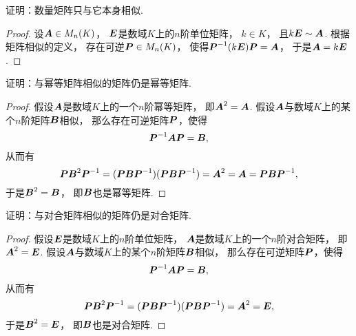 \begin{example}
证明：数量矩阵只与它本身相似.
\begin{proof}
设\(\boldsymbol{A} \in M_n(K)\)，
\(\boldsymbol{E}\)是数域\(K\)上的\(n\)阶单位矩阵，
\(k \in K\)，
且\(k\boldsymbol{E} \sim \boldsymbol{A}\).
根据矩阵相似的定义，
存在可逆\(\boldsymbol{P} \in M_n(K)\)，
使得\(\boldsymbol{P}^{-1} (k\boldsymbol{E}) \boldsymbol{P} = \boldsymbol{A}\)，
于是\(\boldsymbol{A} = k\boldsymbol{E}\).
\end{proof}
\end{example}
\begin{example}\label{example:幂等矩阵.幂等矩阵的相似类}
证明：与幂等矩阵相似的矩阵仍是幂等矩阵.
\begin{proof}
假设\(\boldsymbol{A}\)是数域\(K\)上的一个\(n\)阶幂等矩阵，
即\(\boldsymbol{A}^2=\boldsymbol{A}\).
假设\(\boldsymbol{A}\)与数域\(K\)上的某个\(n\)阶矩阵\(\boldsymbol{B}\)相似，
那么存在可逆矩阵\(\boldsymbol{P}\)，使得\begin{equation*}
	\boldsymbol{P}^{-1}\boldsymbol{A}\boldsymbol{P} = \boldsymbol{B},
\end{equation*}
从而有\begin{equation*}
	\boldsymbol{P}\boldsymbol{B}^2\boldsymbol{P}^{-1}
	= (\boldsymbol{P}\boldsymbol{B}\boldsymbol{P}^{-1})(\boldsymbol{P}\boldsymbol{B}\boldsymbol{P}^{-1})
	= \boldsymbol{A}^2
	= \boldsymbol{A}
	= \boldsymbol{P}\boldsymbol{B}\boldsymbol{P}^{-1},
\end{equation*}
于是\(\boldsymbol{B}^2=\boldsymbol{B}\)，
即\(\boldsymbol{B}\)也是幂等矩阵.
\end{proof}
\end{example}
\begin{example}\label{example:对合矩阵.对合矩阵的相似类}
证明：与对合矩阵相似的矩阵仍是对合矩阵.
\begin{proof}
假设\(\boldsymbol{E}\)是数域\(K\)上的\(n\)阶单位矩阵，
\(\boldsymbol{A}\)是数域\(K\)上的一个\(n\)阶对合矩阵，
即\(\boldsymbol{A}^2=\boldsymbol{E}\).
假设\(\boldsymbol{A}\)与数域\(K\)上的某个\(n\)阶矩阵\(\boldsymbol{B}\)相似，
那么存在可逆矩阵\(\boldsymbol{P}\)，使得\begin{equation*}
	\boldsymbol{P}^{-1}\boldsymbol{A}\boldsymbol{P} = \boldsymbol{B},
\end{equation*}
从而有\begin{equation*}
	\boldsymbol{P}\boldsymbol{B}^2\boldsymbol{P}^{-1}
	= (\boldsymbol{P}\boldsymbol{B}\boldsymbol{P}^{-1})(\boldsymbol{P}\boldsymbol{B}\boldsymbol{P}^{-1})
	= \boldsymbol{A}^2
	= \boldsymbol{E},
\end{equation*}
于是\(\boldsymbol{B}^2=\boldsymbol{E}\)，
即\(\boldsymbol{B}\)也是对合矩阵.
\end{proof}
\end{example}

